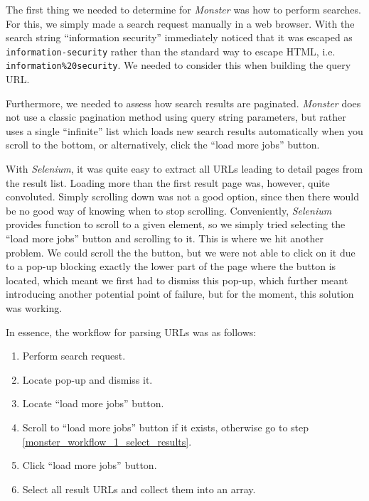 \documentclass[runningheads]{llncs}
\begin{document}
The first thing we needed to determine for \textit{Monster} \cite{monster} was how to perform searches. For this, we simply made a search request manually in a web browser. With the search string “information security” immediately noticed that it was escaped as \texttt{information-security} rather than the standard way to escape HTML, i.e. \texttt{information\%20security}. We needed to consider this when building the query URL.

Furthermore, we needed to assess how search results are paginated. \textit{Monster} does not use a classic pagination method using query string parameters, but rather uses a single “infinite” list which loads new search results automatically when you scroll to the bottom, or alternatively, click the “load more jobs” button.

With \textit{Selenium}, it was quite easy to extract all URLs leading to detail pages from the result list. Loading more than the first result page was, however, quite convoluted. Simply scrolling down was not a good option, since then there would be no good way of knowing when to stop scrolling. Conveniently, \textit{Selenium} provides function to scroll to a given element, so we simply tried selecting the “load more jobs” button and scrolling to it. This is where we hit another problem. We could scroll the the button, but we were not able to click on it due to a pop-up blocking exactly the lower part of the page where the button is located, which meant we first had to dismiss this pop-up, which further meant introducing another potential point of failure, but for the moment, this solution was working.

In essence, the workflow for parsing URLs was as follows:

\begin{enumerate}
  \item Perform search request.
  \item Locate pop-up and dismiss it.
  \item Locate “load more jobs” button.
  \item \label{monster_workflow_1_scroll_to_button}
    Scroll to “load more jobs” button if it exists, otherwise go to step \ref{monster_workflow_1_select_results}.
  \item \label{monster_workflow_1_click_button}
    Click “load more jobs” button.
  \item \label{monster_workflow_1_select_results}
    Select all result URLs and collect them into an array.
\end{enumerate}
\end{document}
